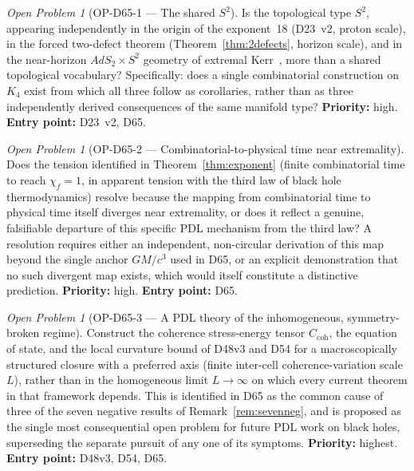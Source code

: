 \documentclass[11pt,a4paper]{article}
\theoremstyle{plain}
\theoremstyle{definition}
\theoremstyle{remark}
\newtheorem{openproblem}[theorem]{Open Problem}
\newcommand{\Kfour}{K_4}
\newcommand{\Ccoh}{C_{\mathrm{coh}}}
\begin{document}
\begin{openproblem}[OP-D65-1 --- The shared $S^2$]
\label{op:D65one}
Is the topological type $S^2$, appearing independently in the origin of the exponent~18 (D23~v2, proton scale), in the forced two-defect theorem (Theorem~\ref{thm:2defects}, horizon scale), and in the near-horizon $AdS_2\times S^2$ geometry of extremal Kerr~\cite{GuicaHartmanSongStrominger2009}, more than a shared topological vocabulary? Specifically: does a single combinatorial construction on $\Kfour$ exist from which all three follow as corollaries, rather than as three independently derived consequences of the same manifold type? \textbf{Priority:} high. \textbf{Entry point:} D23~v2, D65.
\end{openproblem}

\begin{openproblem}[OP-D65-2 --- Combinatorial-to-physical time near extremality]
\label{op:D65two}
Does the tension identified in Theorem~\ref{thm:exponent} (finite combinatorial time to reach $\chi_f=1$, in apparent tension with the third law of black hole thermodynamics) resolve because the mapping from combinatorial time to physical time itself diverges near extremality, or does it reflect a genuine, falsifiable departure of this specific PDL mechanism from the third law? A resolution requires either an independent, non-circular derivation of this map beyond the single anchor $GM/c^3$ used in D65, or an explicit demonstration that no such divergent map exists, which would itself constitute a distinctive prediction. \textbf{Priority:} high. \textbf{Entry point:} D65.
\end{openproblem}

\begin{openproblem}[OP-D65-3 --- A PDL theory of the inhomogeneous, symmetry-broken regime]
\label{op:D65three}
Construct the coherence stress-energy tensor $\Ccoh$, the equation of state, and the local curvature bound of D48v3 and D54 for a macroscopically structured closure with a preferred axis (finite inter-cell coherence-variation scale $L$), rather than in the homogeneous limit $L\to\infty$ on which every current theorem in that framework depends. This is identified in D65 as the common cause of three of the seven negative results of Remark~\ref{rem:sevenneg}, and is proposed as the single most consequential open problem for future PDL work on black holes, superseding the separate pursuit of any one of its symptoms. \textbf{Priority:} highest. \textbf{Entry point:} D48v3, D54, D65.
\end{openproblem}
\end{document}
